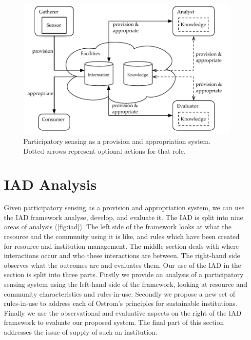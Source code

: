 \begin{figure}
\includegraphics[width=\linewidth]{gfx/Prov_and_app_sys_diag}
\caption[Participatory sensing as a provision and appropriation system]{Participatory sensing as a provision and appropriation system. Dotted arrows represent optional actions for that role.}\label{fig:psys}
\end{figure}

\section{IAD Analysis}

Given participatory sensing as a provision and appropriation system, we can use the \ac{IAD} framework analyse, develop, and evaluate it. 
The \ac{IAD} is split into nine areas of analysis (\autoref{fig:iad}). 
The left side of the framework looks at what the resource and the community using it is like, and rules which have been created for resource and institution management. 
The middle section deals with where interactions occur and who these interactions are between. 
The right-hand side observes what the outcomes are and evaluates them.
Our use of the \ac{IAD} in the section is split into three parts.
Firstly we provide an analysis of a participatory sensing system using the left-hand side of the framework, looking at resource and community characteristics and rules-in-use. 
Secondly we propose a new set of rules-in-use to address each of Ostrom's principles for sustainable institutions. 
Finally we use the observational and evaluative aspects on the right of the \ac{IAD} framework to evaluate our proposed system.
The final part of this section addresses the issue of supply of such an institution.

